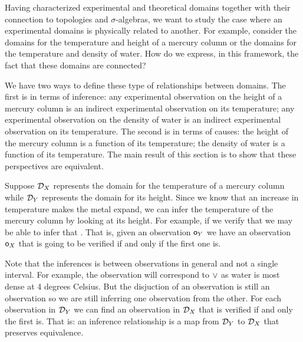 \documentclass[11pt,letterpaper,fleqn]{memoir} %
\begin{document}
Having characterized experimental and theoretical domains together with their connection to topologies and $\sigma$-algebras, we want to study the case where an experimental domains is physically related to another. For example, consider the domains for the temperature and height of a mercury column or the domains for the temperature and density of water. How do we express, in this framework, the fact that these domains are connected?

We have two ways to define these type of relationships between domains. The first is in terms of inference: any experimental observation on the height of a mercury column is an indirect experimental observation on its temperature; any experimental observation on the density of water is an indirect experimental observation on its temperature. The second is in terms of causes: the height of the mercury column is a function of its temperature; the density of water is a function of its temperature. The main result of this section is to show that these perspectives are equivalent.

Suppose $\mathcal{D}_X$ represents the domain for the temperature of a mercury column while $\mathcal{D}_Y$ represents the domain for its height. Since we know that an increase in temperature makes the metal expand, we can infer the temperature of the mercury column by looking at its height. For example, if we verify that  we may be able to infer that . That is, given an observation $\mathsf{o}_Y$ we have an observation $\mathsf{o}_X$ that is going to be verified if and only if the first one is.

Note that the inferences is between observations in general and not a single interval. For example, the observation  will correspond to $\vee$ as water is most dense at 4 degrees Celsius. But the disjuction of an observation is still an observation so we are still inferring one observation from the other. For each observation in $\mathcal{D}_Y$ we can find an observation in $\mathcal{D}_X$ that is verified if and only the first is. That is: an inference relationship is a map from $\mathcal{D}_Y$ to $\mathcal{D}_X$ that preserves equivalence.
\end{document}
